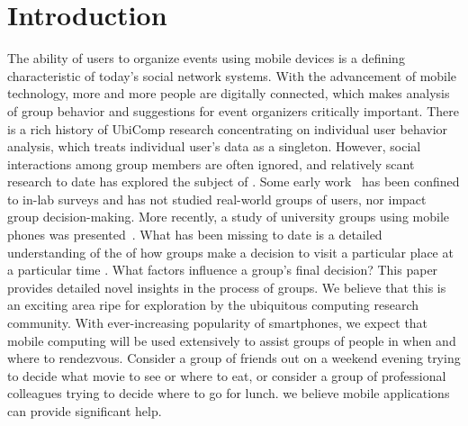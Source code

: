 \section{Introduction}
\label{sec:intro} 

The ability of users to organize events using mobile devices is a defining 
characteristic of today's social network systems. With the advancement of 
mobile technology, more and more people are digitally connected, which 
makes  analysis of 
{group behavior and suggestions}  for event organizers critically important. 
There is a rich history of UbiComp research concentrating on individual 
user behavior analysis, which treats individual user's data as a singleton.
However, social interactions among group members are often ignored, and
relatively scant research to date has explored the subject of 
. 
Some early work~\cite{beckmann2011agremo, park2008restaurant} has 
been confined to in-lab surveys and has not studied  real-world
 groups of users, nor  impact
 group  decision-making.  More recently, a study of university groups
using mobile phones was presented~\cite{jayarajah2015need}.  What has been missing to date is a detailed
understanding of the  of how groups 
make a decision to visit a particular place at a particular time . 
What factors influence a group's final decision? This paper provides detailed novel insights in the  process of  groups.  
We believe that this is an exciting area ripe for exploration by the ubiquitous computing research 
community. With ever-increasing popularity of smartphones, we 
expect that mobile computing will be used extensively to assist
groups of people in 
 when and where to rendezvous. Consider a group of
friends out on a weekend evening trying to decide what movie to see or where to eat, or consider a group of professional
colleagues trying to decide where to go for lunch.  
we believe mobile applications  can provide significant help.

